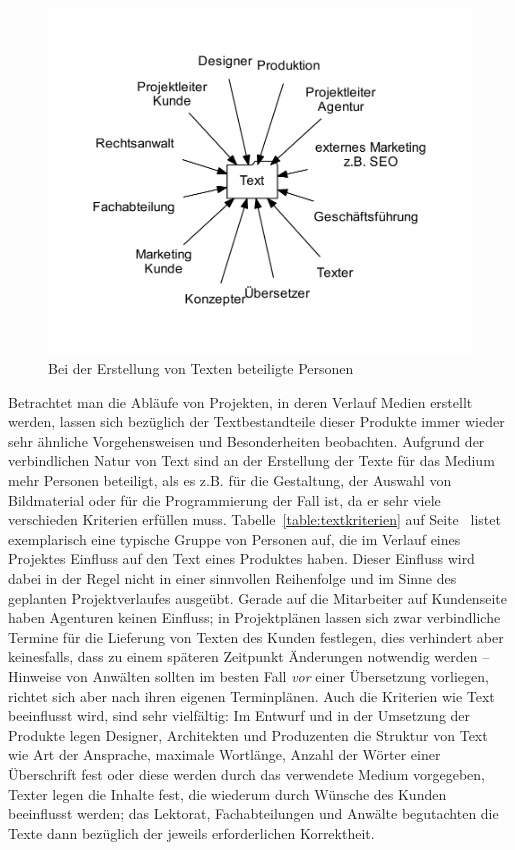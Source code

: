 \begin{figure}[htb]
\begin{center}
\includegraphics[width=\textwidth]{media/chart-2.pdf}
\end{center}
\caption{Bei der Erstellung von Texten beteiligte Personen}
\label{chart:2}
\end{figure}

Betrachtet man die Abläufe von Projekten, in deren Verlauf Medien erstellt werden, lassen sich bezüglich der Textbestandteile dieser Produkte immer wieder sehr ähnliche Vorgehensweisen und Besonderheiten beobachten. Aufgrund der verbindlichen Natur von Text sind an der Erstellung der Texte für das Medium mehr Personen beteiligt, als es z.B. für die Gestaltung, der Auswahl von Bildmaterial oder für die Programmierung der Fall ist,  da er sehr viele verschieden Kriterien erfüllen muss. Tabelle~\ref{table:textkriterien} auf Seite~\pageref{table:textkriterien} listet exemplarisch eine typische Gruppe von Personen auf, die im Verlauf eines Projektes Einfluss auf den Text eines Produktes haben. Dieser Einfluss wird dabei in der Regel nicht in einer sinnvollen Reihenfolge und im Sinne des geplanten Projektverlaufes ausgeübt. Gerade auf die Mitarbeiter auf Kundenseite haben Agenturen keinen Einfluss; in Projektplänen lassen sich zwar verbindliche Termine für die Lieferung von Texten des Kunden festlegen, dies verhindert aber keinesfalls, dass zu einem späteren Zeitpunkt Änderungen notwendig werden -- Hinweise von Anwälten sollten im besten Fall \emph{vor} einer Übersetzung vorliegen, richtet sich aber nach ihren eigenen Terminplänen. Auch die Kriterien wie Text beeinflusst wird, sind sehr vielfältig: Im Entwurf und in der Umsetzung der Produkte legen Designer, Architekten und Produzenten die Struktur von Text wie Art der Ansprache, maximale Wortlänge, Anzahl der Wörter einer Überschrift fest oder diese werden durch das verwendete Medium vorgegeben, Texter legen die Inhalte fest, die wiederum durch Wünsche des Kunden beeinflusst werden; das Lektorat, Fachabteilungen und Anwälte begutachten die Texte dann bezüglich der jeweils erforderlichen Korrektheit.

